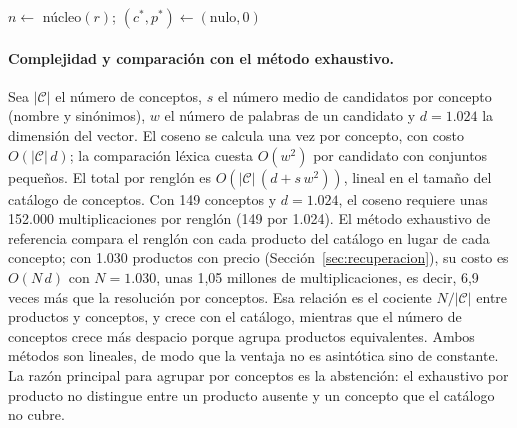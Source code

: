 \begin{algorithm}[H]
\caption{Resolución de un renglón contra el catálogo de conceptos}
\label{alg:resolucion}
$n \leftarrow$ núcleo$(r)$; $(c^*, p^*) \leftarrow (\text{nulo}, 0)$\;
\;
\end{algorithm}

\paragraph{Complejidad y comparación con el método exhaustivo.} Sea $|\mathcal{C}|$ el número de
conceptos, $s$ el número medio de candidatos por concepto (nombre y sinónimos), $w$ el número de
palabras de un candidato y $d=1.024$ la dimensión del vector. El coseno se calcula una vez por
concepto, con costo $O(|\mathcal{C}|\,d)$; la comparación léxica cuesta $O(w^2)$ por candidato con
conjuntos pequeños. El total por renglón es $O(|\mathcal{C}|\,(d+s\,w^2))$, lineal en el
tamaño del catálogo de conceptos. Con 149 conceptos y $d=1.024$, el coseno requiere unas 152.000
multiplicaciones por renglón (149 por 1.024). El método exhaustivo de referencia compara el
renglón con cada producto del catálogo en lugar de cada concepto; con 1.030 productos con precio
(Sección~\ref{sec:recuperacion}), su costo es $O(N\,d)$ con $N=1.030$, unas 1,05 millones de
multiplicaciones, es decir, 6,9 veces más que la resolución por conceptos. Esa relación es el cociente
$N/|\mathcal{C}|$ entre productos y conceptos, y crece con el catálogo, mientras que el número de
conceptos crece más despacio porque agrupa productos equivalentes. Ambos métodos son lineales, de
modo que la ventaja no es asintótica sino de constante. La razón principal para agrupar por conceptos
es la abstención: el exhaustivo por producto no distingue entre un producto ausente y un
concepto que el catálogo no cubre.

